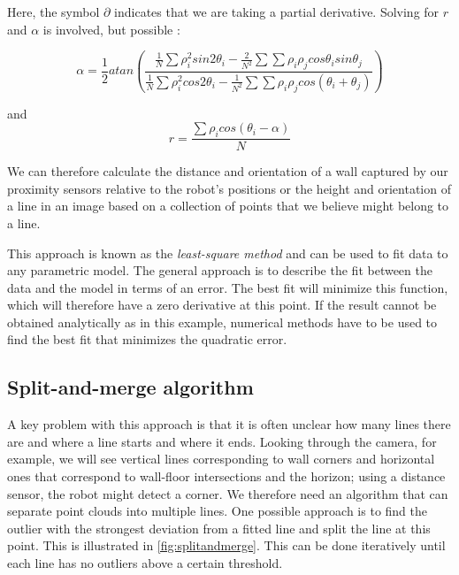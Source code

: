 Here, the symbol $ \partial$ indicates that we are taking a partial derivative. Solving for $r$ and $\alpha$ is involved, but possible \cite{siegwart2011introduction}:

\begin{equation}\label{eq:linealpha}
\alpha=\frac{1}{2}atan\left(\frac{\frac{1}{N}\sum{\rho_i^2 sin 2\theta_i}-\frac{2}{N^2}\sum{\sum{\rho_i\rho_j cos \theta_i sin \theta_j}}}{\frac{1}{N}\sum{\rho_i^2 cos 2 \theta_i - \frac{1}{N^2}\sum{\sum{\rho_i \rho_j cos(\theta_i+\theta_j)}}}}\right)
\end{equation}

and
\begin{equation}\label{eq:liner}
r=\frac{{\sum \rho_i cos (\theta_i-\alpha)}}{N}
\end{equation}

We can therefore calculate the distance and orientation of a wall captured by our proximity sensors relative to the robot's positions or the height and orientation of a line in an image based on a collection of points that we believe might belong to a line.

This approach is known as the \textsl{least-square method} and can be used to fit data to any parametric model. The general approach is to describe the fit between the data and the model in terms of an error. The best fit will minimize this function, which will therefore have a zero derivative at this point. If the result cannot be obtained analytically as in this example, numerical methods have to be used to find the best fit that minimizes the quadratic error.

\subsection{Split-and-merge algorithm}
A key problem with this approach is that it is often unclear how many lines there are and where a line starts and where it ends. Looking through the camera, for example, we will see vertical lines corresponding to wall corners and horizontal ones that correspond to wall-floor intersections and the horizon; using a distance sensor, the robot might detect a corner. We therefore need an algorithm that can separate point clouds into multiple lines. One possible approach is to find the outlier with the strongest deviation from a fitted line and split the line at this point. This is illustrated in \cref{fig:splitandmerge}. This can be done iteratively until each line has no outliers above a certain threshold.

